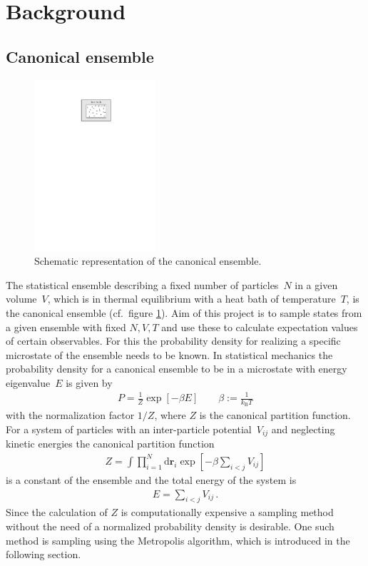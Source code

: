 \documentclass[11pt, a4paper]{article}
\numberwithin{equation}{section}
\begin{document}
\section{Background}

\subsection{Canonical ensemble} \label{sec:Canonical_Ensemble}
\begin{figure}
	\centering
	\includegraphics[width=0.4\textwidth]{./figures/canonical_ensemble.pdf}
	\caption{Schematic representation of the canonical ensemble.}
	\label{fig:canonical_ensemble}
\end{figure}
The statistical ensemble describing a fixed number of particles~$N$ in a given volume~$V$, which is in thermal equilibrium with a heat bath of temperature~$T$, is the canonical ensemble (cf.\ figure \ref{fig:canonical_ensemble}).
Aim of this project is to sample states from a given ensemble with fixed $N, V, T$ and use these to calculate expectation values of certain observables.
For this the probability density for realizing a specific microstate of the ensemble needs to be known.
In statistical mechanics the probability density for a canonical ensemble to be in a microstate with energy eigenvalue~$E$ is given by \cite{schwabl}
\begin{align*}
	P = \frac{1}{Z} \exp\left[ -\beta E \right] \qquad \beta := \frac{1}{k_\mathrm{B} T}
\end{align*}
with the normalization factor $1/Z$, where $Z$ is the canonical partition function.
For a system of particles with an inter-particle potential~$V_{ij}$ and neglecting kinetic energies the canonical partition function
\begin{align*}
	Z = \int \prod_{i=1}^N \mathrm{d}\mathbf{r}_i \exp\left[ -\beta \sum_{i < j} V_{ij} \right]
\end{align*}
is a constant of the ensemble and the total energy of the system is
\begin{align*}
	E = \sum_{i < j} V_{ij} \, \text{.}
\end{align*}
Since the calculation of $Z$ is computationally expensive a sampling method without the need of a normalized probability density is desirable.
One such method is sampling using the Metropolis algorithm, which is introduced in the following section.
\end{document}
